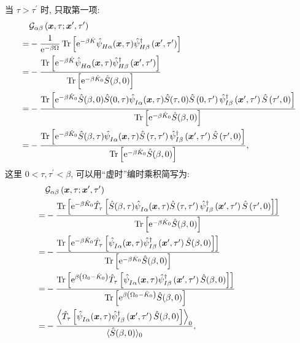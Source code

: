 当 $\tau>\tau^{\prime}$ 时, 只取第一项:
\begin{align}
&\mathcal{G}_{\alpha \beta}\left(\boldsymbol{x}, \tau ; \boldsymbol{x}^{\prime}, \tau^{\prime}\right) \nonumber\\
=& -\frac{1}{\mathrm{e}^{-\beta \Omega}} \operatorname{Tr}\left[\mathrm{e}^{-\beta \hat{K}} \hat{\psi}^{}_{H \alpha}(\boldsymbol{x}, \tau) \hat{\psi}_{H \beta}^{\dagger}\left(\boldsymbol{x}^{\prime}, \tau^{\prime}\right)\right]\nonumber \\
=& -\frac{\operatorname{Tr}\left[\mathrm{e}^{-\beta \hat{K}} \hat{\psi}^{}_{H \alpha}(\boldsymbol{x}, \tau) \hat{\psi}_{H \beta}^{\dagger}\left(\boldsymbol{x}^{\prime}, \tau^{\prime}\right)\right]}{\operatorname{Tr}\left[\mathrm{e}^{-\beta \hat{K}_0} \hat{S}(\beta, 0)\right]} \nonumber\\
=& -\frac{\operatorname{Tr}\left[\mathrm{e}^{-\beta \hat{K}_0} \hat{S}(\beta, 0) \hat{S}(0, \tau) \hat{\psi}^{}_{I \alpha}(\boldsymbol{x}, \tau) \hat{S}(\tau, 0) \hat{S}\left(0, \tau^{\prime}\right) \hat{\psi}_{I \beta}^{\dagger}\left(\boldsymbol{x}^{\prime}, \tau^{\prime}\right) \hat{S}\left(\tau^{\prime}, 0\right)\right]}{\operatorname{Tr}\left[\mathrm{e}^{-\beta \hat{K}_0} \hat{S}(\beta, 0)\right]} \nonumber\\
=& -\frac{\operatorname{Tr}\left[\mathrm{e}^{-\beta \hat{K}_0} \hat{S}(\beta, \tau) \hat{\psi}^{}_{I \alpha}(\boldsymbol{x}, \tau) \hat{S}\left(\tau, \tau^{\prime}\right) \hat{\psi}_{I \beta}^{\dagger}\left(\boldsymbol{x}^{\prime}, \tau^{\prime}\right) \hat{S}\left(\tau^{\prime}, 0\right)\right]}{\operatorname{Tr}\left[\mathrm{e}^{-\beta \hat{K}_0} \hat{S}(\beta, 0)\right]},
\end{align}
这里 $0<\tau, \tau^{\prime}<\beta$, 可以用“虚时”编时乘积简写为:
\begin{align}
&\mathcal{G}_{\alpha \beta}\left(\boldsymbol{x}, \tau ; \boldsymbol{x}^{\prime}, \tau^{\prime}\right)\nonumber\\
=& -\frac{\operatorname{Tr}\left[\mathrm{e}^{-\beta \hat{K}_0} \hat{T}_\tau\left[\hat{S}(\beta, \tau) \hat{\psi}^{}_{I \alpha}(\boldsymbol{x}, \tau) \hat{S}\left(\tau, \tau^{\prime}\right) \hat{\psi}_{I \beta}^{\dagger}\left(\boldsymbol{x}^{\prime}, \tau^{\prime}\right) \hat{S}\left(\tau^{\prime}, 0\right)\right]\right]}{\operatorname{Tr}\left[\mathrm{e}^{-\beta \hat{K}_0} \hat{S}(\beta, 0)\right]}\nonumber \\
=& -\frac{\operatorname{Tr}\left[\mathrm{e}^{-\beta \hat{K}_0} \hat{T}_\tau\left[\hat{\psi}^{}_{I \alpha}(\boldsymbol{x}, \tau) \hat{\psi}_{I \beta}^{\dagger}\left(\boldsymbol{x}^{\prime}, \tau^{\prime}\right) \hat{S}(\beta, 0)\right]\right]}{\operatorname{Tr}\left[\mathrm{e}^{-\beta \hat{K}_0} \hat{S}(\beta, 0)\right]} \nonumber\\
=& -\frac{\operatorname{Tr}\left[\mathrm{e}^{\beta\left(\Omega_0-\hat{K}_0\right)} \hat{T}_\tau\left[\hat{\psi}^{}_{I \alpha}(\boldsymbol{x}, \tau) \hat{\psi}_{I \beta}^{\dagger}\left(\boldsymbol{x}^{\prime}, \tau^{\prime}\right) \hat{S}(\beta, 0)\right]\right]}{\operatorname{Tr}\left[\mathrm{e}^{\beta\left(\Omega_0-\hat{K}_0\right)} \hat{S}(\beta, 0)\right]}\nonumber \\
=& -\frac{\left\langle\hat{T}_\tau\left[\hat{\psi}^{}_{I \alpha}(\boldsymbol{x}, \tau) \hat{\psi}_{I \beta}^{\dagger}\left(\boldsymbol{x}^{\prime}, \tau^{\prime}\right) \hat{S}(\beta, 0)\right]\right\rangle_0}{\langle\hat{S}(\beta, 0)\rangle_0} ,
\end{align}
